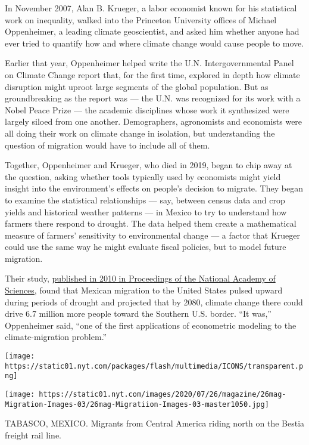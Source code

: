 In November 2007, Alan B. Krueger, a labor economist known for his
statistical work on inequality, walked into the Princeton University
offices of Michael Oppenheimer, a leading climate geoscientist, and
asked him whether anyone had ever tried to quantify how and where
climate change would cause people to move.

Earlier that year, Oppenheimer helped write the U.N. Intergovernmental
Panel on Climate Change report that, for the first time, explored in
depth how climate disruption might uproot large segments of the global
population. But as groundbreaking as the report was --- the U.N. was
recognized for its work with a Nobel Peace Prize --- the academic
disciplines whose work it synthesized were largely siloed from one
another. Demographers, agronomists and economists were all doing their
work on climate change in isolation, but understanding the question of
migration would have to include all of them.

Together, Oppenheimer and Krueger, who died in 2019, began to chip away
at the question, asking whether tools typically used by economists might
yield insight into the environment's effects on people's decision to
migrate. They began to examine the statistical relationships --- say,
between census data and crop yields and historical weather patterns ---
in Mexico to try to understand how farmers there respond to drought. The
data helped them create a mathematical measure of farmers' sensitivity
to environmental change --- a factor that Krueger could use the same way
he might evaluate fiscal policies, but to model future migration.

Their study, \href{https://www.pnas.org/content/107/32/14257}{published
in 2010 in Proceedings of the National Academy of Sciences,} found that
Mexican migration to the United States pulsed upward during periods of
drought and projected that by 2080, climate change there could drive 6.7
million more people toward the Southern U.S. border. ``It was,''
Oppenheimer said, ``one of the first applications of econometric
modeling to the climate-migration problem.''

\texttt{[image: https://static01.nyt.com/packages/flash/multimedia/ICONS/transparent.png]}

\texttt{[image: https://static01.nyt.com/images/2020/07/26/magazine/26mag-Migration-Images-03/26mag-Migratiion-Images-03-master1050.jpg]}

TABASCO, MEXICO. Migrants from Central America riding north on the
Bestia freight rail line.

